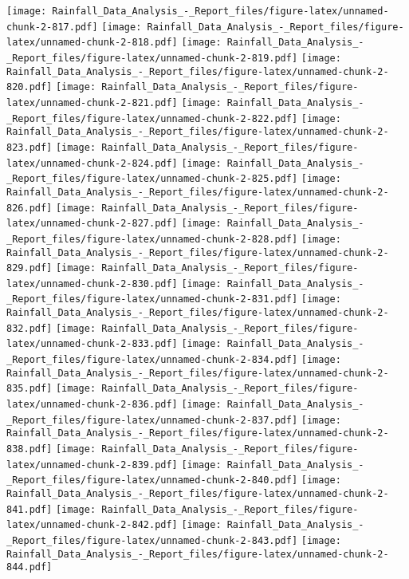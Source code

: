 \documentclass[
]{article}
\begin{document}
\texttt{[image: Rainfall\_Data\_Analysis\_-\_Report\_files/figure-latex/unnamed-chunk-2-817.pdf]}
\texttt{[image: Rainfall\_Data\_Analysis\_-\_Report\_files/figure-latex/unnamed-chunk-2-818.pdf]}
\texttt{[image: Rainfall\_Data\_Analysis\_-\_Report\_files/figure-latex/unnamed-chunk-2-819.pdf]}
\texttt{[image: Rainfall\_Data\_Analysis\_-\_Report\_files/figure-latex/unnamed-chunk-2-820.pdf]}
\texttt{[image: Rainfall\_Data\_Analysis\_-\_Report\_files/figure-latex/unnamed-chunk-2-821.pdf]}
\texttt{[image: Rainfall\_Data\_Analysis\_-\_Report\_files/figure-latex/unnamed-chunk-2-822.pdf]}
\texttt{[image: Rainfall\_Data\_Analysis\_-\_Report\_files/figure-latex/unnamed-chunk-2-823.pdf]}
\texttt{[image: Rainfall\_Data\_Analysis\_-\_Report\_files/figure-latex/unnamed-chunk-2-824.pdf]}
\texttt{[image: Rainfall\_Data\_Analysis\_-\_Report\_files/figure-latex/unnamed-chunk-2-825.pdf]}
\texttt{[image: Rainfall\_Data\_Analysis\_-\_Report\_files/figure-latex/unnamed-chunk-2-826.pdf]}
\texttt{[image: Rainfall\_Data\_Analysis\_-\_Report\_files/figure-latex/unnamed-chunk-2-827.pdf]}
\texttt{[image: Rainfall\_Data\_Analysis\_-\_Report\_files/figure-latex/unnamed-chunk-2-828.pdf]}
\texttt{[image: Rainfall\_Data\_Analysis\_-\_Report\_files/figure-latex/unnamed-chunk-2-829.pdf]}
\texttt{[image: Rainfall\_Data\_Analysis\_-\_Report\_files/figure-latex/unnamed-chunk-2-830.pdf]}
\texttt{[image: Rainfall\_Data\_Analysis\_-\_Report\_files/figure-latex/unnamed-chunk-2-831.pdf]}
\texttt{[image: Rainfall\_Data\_Analysis\_-\_Report\_files/figure-latex/unnamed-chunk-2-832.pdf]}
\texttt{[image: Rainfall\_Data\_Analysis\_-\_Report\_files/figure-latex/unnamed-chunk-2-833.pdf]}
\texttt{[image: Rainfall\_Data\_Analysis\_-\_Report\_files/figure-latex/unnamed-chunk-2-834.pdf]}
\texttt{[image: Rainfall\_Data\_Analysis\_-\_Report\_files/figure-latex/unnamed-chunk-2-835.pdf]}
\texttt{[image: Rainfall\_Data\_Analysis\_-\_Report\_files/figure-latex/unnamed-chunk-2-836.pdf]}
\texttt{[image: Rainfall\_Data\_Analysis\_-\_Report\_files/figure-latex/unnamed-chunk-2-837.pdf]}
\texttt{[image: Rainfall\_Data\_Analysis\_-\_Report\_files/figure-latex/unnamed-chunk-2-838.pdf]}
\texttt{[image: Rainfall\_Data\_Analysis\_-\_Report\_files/figure-latex/unnamed-chunk-2-839.pdf]}
\texttt{[image: Rainfall\_Data\_Analysis\_-\_Report\_files/figure-latex/unnamed-chunk-2-840.pdf]}
\texttt{[image: Rainfall\_Data\_Analysis\_-\_Report\_files/figure-latex/unnamed-chunk-2-841.pdf]}
\texttt{[image: Rainfall\_Data\_Analysis\_-\_Report\_files/figure-latex/unnamed-chunk-2-842.pdf]}
\texttt{[image: Rainfall\_Data\_Analysis\_-\_Report\_files/figure-latex/unnamed-chunk-2-843.pdf]}
\texttt{[image: Rainfall\_Data\_Analysis\_-\_Report\_files/figure-latex/unnamed-chunk-2-844.pdf]}
\end{document}
